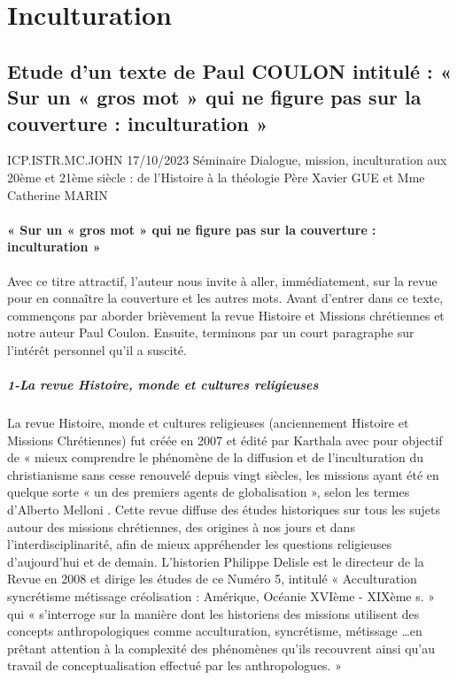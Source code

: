 \chapter{Inculturation}


\section{Etude d’un texte de Paul COULON intitulé : « Sur un « gros mot » qui ne figure pas sur la couverture : inculturation » }



ICP.ISTR.MC.JOHN 17/10/2023
Séminaire Dialogue, mission, inculturation aux 20ème et 21ème siècle : de l’Histoire à la théologie
 Père Xavier GUE et Mme Catherine MARIN 


\subsubsection{« Sur un « gros mot » qui ne figure pas sur la couverture : inculturation »}


Avec ce titre attractif, l’auteur nous invite à aller, immédiatement, sur la revue pour en connaître la couverture et les autres mots. 
Avant d’entrer dans ce texte, commençons par aborder brièvement la revue Histoire et Missions chrétiennes et notre auteur Paul Coulon. Ensuite, terminons par un court paragraphe sur l’intérêt personnel qu’il a suscité. 

\paragraph{1-La revue Histoire, monde et cultures religieuses}

La revue Histoire, monde et cultures religieuses (anciennement Histoire et Missions Chrétiennes) fut créée en 2007 et édité par Karthala avec pour objectif de « mieux comprendre le phénomène de la diffusion et de l’inculturation du christianisme sans cesse renouvelé depuis vingt siècles, les missions ayant été en quelque sorte « un des premiers agents de globalisation », selon les termes d’Alberto Melloni . 
Cette revue diffuse des études historiques sur tous les sujets autour des missions chrétiennes, des origines à nos jours et dans l’interdisciplinarité, afin de mieux appréhender les questions religieuses d’aujourd’hui et de demain. 
L’historien Philippe Delisle   est le directeur de la Revue en 2008 et dirige les études de ce Numéro 5, intitulé « Acculturation syncrétisme métissage créolisation : Amérique, Océanie XVIème - XIXème s. » qui « s’interroge sur la manière dont les historiens  des missions utilisent des concepts anthropologiques  comme acculturation, syncrétisme, métissage …en prêtant attention à la complexité des phénomènes qu’ils recouvrent ainsi qu’au travail de conceptualisation effectué par les anthropologues. » 


